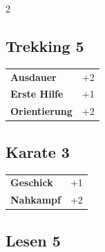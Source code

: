 \begin{multicols}{2}
\begin{tcolorbox}
\end{tcolorbox}

\begin{tcolorbox}
    \subsection*{Trekking \hfill \small{5 }}
    \tcblower




\begin{tabular}{@{}ll@{}}
    \textbf{Ausdauer} & +2\\
    \textbf{Erste Hilfe} & +1\\
    \textbf{Orientierung} & +2\\
\end{tabular}


\end{tcolorbox}

\begin{tcolorbox}
    \subsection*{Karate \hfill \small{3 }}
    \tcblower




\begin{tabular}{@{}ll@{}}
    \textbf{Geschick} & +1\\
    \textbf{Nahkampf} & +2\\
\end{tabular}


\end{tcolorbox}

\begin{tcolorbox}
    \subsection*{Lesen \hfill \small{5 }}
    \tcblower





\end{tcolorbox}
\end{multicols}
